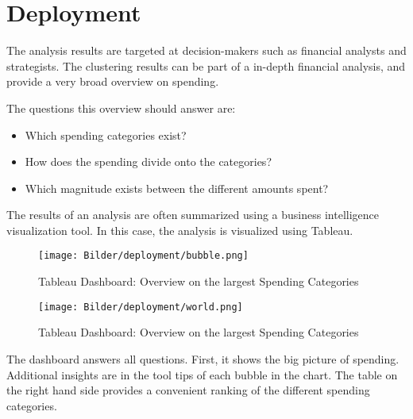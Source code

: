 
\chapter{Deployment}
	The analysis results are targeted at decision-makers such as financial analysts and strategists. The clustering results can be part of a in-depth financial analysis, and provide a very broad overview on spending.
	
	The questions this overview should answer are:
	\begin{itemize}
		\item Which spending categories exist?
		\item How does the spending divide onto the categories?
		\item Which magnitude exists between the different amounts spent?
	\end{itemize}
	
	The results of an analysis are often summarized using a business intelligence visualization tool. In this case, the analysis is visualized using Tableau.
\begin{figure}[h!]
	\centering
	\texttt{[image: Bilder/deployment/bubble.png]}
	\caption{Tableau Dashboard: Overview on the largest Spending Categories}
	\label{fig:dashboard-bubble}
\end{figure}

\begin{figure}[h!]
	\centering
	\texttt{[image: Bilder/deployment/world.png]}
	\caption{Tableau Dashboard: Overview on the largest Spending Categories}
	\label{fig:dashboard-world}
\end{figure}

	The dashboard answers all questions. First, it shows the big picture of spending. Additional insights are in the tool tips of each bubble in the chart. The table on the right hand side provides a convenient ranking of the different spending categories.
	
